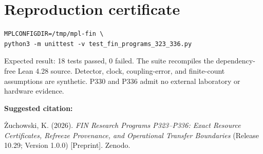\documentclass[11pt,a4paper,openany]{report}
\begin{document}
\clearpage
\chapter*{Reproduction certificate}
\begin{Verbatim}[fontsize=\small]
MPLCONFIGDIR=/tmp/mpl-fin \
python3 -m unittest -v test_fin_programs_323_336.py
\end{Verbatim}
Expected result: 18 tests passed, 0 failed.  The suite recompiles the
dependency-free Lean 4.28 source.  Detector, clock, coupling-error, and
finite-count assumptions are synthetic.  P330 and P336 admit no external
laboratory or hardware evidence.

\medskip
\noindent\textbf{Suggested citation:}

\.Zuchowski, K. (2026). \emph{FIN Research Programs P323--P336:
Exact Resource Certificates, Refreeze Provenance, and Operational Transfer
Boundaries} (Release 10.29; Version 1.0.0) [Preprint]. Zenodo.
\end{document}
